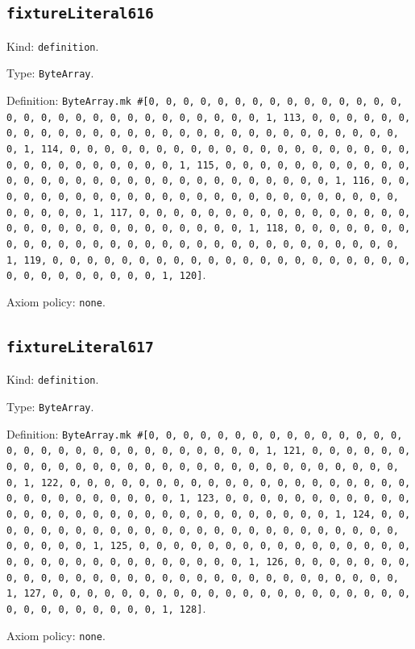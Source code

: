 \documentclass[11pt]{article}
\begin{document}
\subsection*{\texttt{fixtureLiteral616}}
\noindent Kind: \texttt{definition}.\par
\noindent Type: \texttt{ByteArray}.\par
\noindent Definition: \texttt{ByteArray.mk \#[0, 0, 0, 0, 0, 0, 0, 0, 0, 0, 0, 0, 0, 0, 0, 0, 0, 0, 0, 0, 0, 0, 0, 0, 0, 0, 0, 0, 0, 0, 1, 113, 0, 0, 0, 0, 0, 0, 0, 0, 0, 0, 0, 0, 0, 0, 0, 0, 0, 0, 0, 0, 0, 0, 0, 0, 0, 0, 0, 0, 0, 0, 1, 114, 0, 0, 0, 0, 0, 0, 0, 0, 0, 0, 0, 0, 0, 0, 0, 0, 0, 0, 0, 0, 0, 0, 0, 0, 0, 0, 0, 0, 0, 0, 1, 115, 0, 0, 0, 0, 0, 0, 0, 0, 0, 0, 0, 0, 0, 0, 0, 0, 0, 0, 0, 0, 0, 0, 0, 0, 0, 0, 0, 0, 0, 0, 1, 116, 0, 0, 0, 0, 0, 0, 0, 0, 0, 0, 0, 0, 0, 0, 0, 0, 0, 0, 0, 0, 0, 0, 0, 0, 0, 0, 0, 0, 0, 0, 1, 117, 0, 0, 0, 0, 0, 0, 0, 0, 0, 0, 0, 0, 0, 0, 0, 0, 0, 0, 0, 0, 0, 0, 0, 0, 0, 0, 0, 0, 0, 0, 1, 118, 0, 0, 0, 0, 0, 0, 0, 0, 0, 0, 0, 0, 0, 0, 0, 0, 0, 0, 0, 0, 0, 0, 0, 0, 0, 0, 0, 0, 0, 0, 1, 119, 0, 0, 0, 0, 0, 0, 0, 0, 0, 0, 0, 0, 0, 0, 0, 0, 0, 0, 0, 0, 0, 0, 0, 0, 0, 0, 0, 0, 0, 0, 1, 120]}.\par
\noindent Axiom policy: \texttt{none}.\par
\subsection*{\texttt{fixtureLiteral617}}
\noindent Kind: \texttt{definition}.\par
\noindent Type: \texttt{ByteArray}.\par
\noindent Definition: \texttt{ByteArray.mk \#[0, 0, 0, 0, 0, 0, 0, 0, 0, 0, 0, 0, 0, 0, 0, 0, 0, 0, 0, 0, 0, 0, 0, 0, 0, 0, 0, 0, 0, 0, 1, 121, 0, 0, 0, 0, 0, 0, 0, 0, 0, 0, 0, 0, 0, 0, 0, 0, 0, 0, 0, 0, 0, 0, 0, 0, 0, 0, 0, 0, 0, 0, 1, 122, 0, 0, 0, 0, 0, 0, 0, 0, 0, 0, 0, 0, 0, 0, 0, 0, 0, 0, 0, 0, 0, 0, 0, 0, 0, 0, 0, 0, 0, 0, 1, 123, 0, 0, 0, 0, 0, 0, 0, 0, 0, 0, 0, 0, 0, 0, 0, 0, 0, 0, 0, 0, 0, 0, 0, 0, 0, 0, 0, 0, 0, 0, 1, 124, 0, 0, 0, 0, 0, 0, 0, 0, 0, 0, 0, 0, 0, 0, 0, 0, 0, 0, 0, 0, 0, 0, 0, 0, 0, 0, 0, 0, 0, 0, 1, 125, 0, 0, 0, 0, 0, 0, 0, 0, 0, 0, 0, 0, 0, 0, 0, 0, 0, 0, 0, 0, 0, 0, 0, 0, 0, 0, 0, 0, 0, 0, 1, 126, 0, 0, 0, 0, 0, 0, 0, 0, 0, 0, 0, 0, 0, 0, 0, 0, 0, 0, 0, 0, 0, 0, 0, 0, 0, 0, 0, 0, 0, 0, 1, 127, 0, 0, 0, 0, 0, 0, 0, 0, 0, 0, 0, 0, 0, 0, 0, 0, 0, 0, 0, 0, 0, 0, 0, 0, 0, 0, 0, 0, 0, 0, 1, 128]}.\par
\noindent Axiom policy: \texttt{none}.\par
\end{document}
